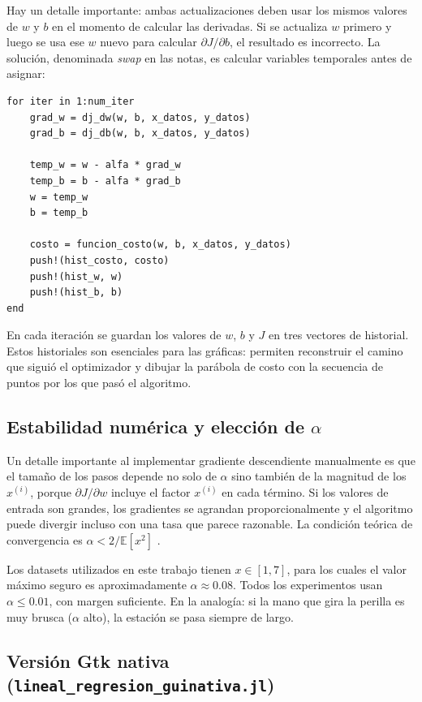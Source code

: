\documentclass[11pt,a4paper]{article}
\begin{document}
Hay un detalle importante: ambas actualizaciones deben usar los mismos valores de $w$ y $b$ en el momento de calcular las derivadas. Si se actualiza $w$ primero y luego se usa ese $w$ nuevo para calcular $\partial J/\partial b$, el resultado es incorrecto. La soluci\'on, denominada \emph{swap} en las notas, es calcular variables temporales antes de asignar:

\begin{lstlisting}
for iter in 1:num_iter
    grad_w = dj_dw(w, b, x_datos, y_datos)
    grad_b = dj_db(w, b, x_datos, y_datos)

    temp_w = w - alfa * grad_w
    temp_b = b - alfa * grad_b
    w = temp_w
    b = temp_b

    costo = funcion_costo(w, b, x_datos, y_datos)
    push!(hist_costo, costo)
    push!(hist_w, w)
    push!(hist_b, b)
end
\end{lstlisting}

En cada iteraci\'on se guardan los valores de $w$, $b$ y $J$ en tres vectores de historial. Estos historiales son esenciales para las gr\'aficas: permiten reconstruir el camino que sigui\'o el optimizador y dibujar la par\'abola de costo con la secuencia de puntos por los que pas\'o el algoritmo.

\subsection{Estabilidad num\'erica y elecci\'on de $\alpha$}

Un detalle importante al implementar gradiente descendiente manualmente es que el tama\~no de los pasos depende no solo de $\alpha$ sino tambi\'en de la magnitud de los $x^{(i)}$, porque $\partial J/\partial w$ incluye el factor $x^{(i)}$ en cada t\'ermino. Si los valores de entrada son grandes, los gradientes se agrandan proporcionalmente y el algoritmo puede divergir incluso con una tasa que parece razonable. La condici\'on te\'orica de convergencia es $\alpha < 2/\mathbb{E}[x^2]$ \cite{hastie2009elements}.

Los datasets utilizados en este trabajo tienen $x \in [1,7]$, para los cuales el valor m\'aximo seguro es aproximadamente $\alpha \approx 0.08$. Todos los experimentos usan $\alpha \leq 0.01$, con margen suficiente. En la analog\'ia: si la mano que gira la perilla es muy brusca ($\alpha$ alto), la estaci\'on se pasa siempre de largo.

\subsection{Versi\'on Gtk nativa (\texttt{lineal\_regresion\_guinativa.jl})}
\end{document}
